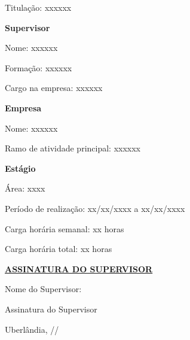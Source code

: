 \documentclass[12pt]{article}
\begin{document}
\hspace{1.1cm} Titulação: xxxxxx

\vspace{0.8cm}

\textbf{Supervisor}

\hspace{1.1cm} Nome: xxxxxx

\hspace{1.1cm} Formação: xxxxxx

\hspace{1.1cm} Cargo na empresa: xxxxxx

\vspace{0.8cm}

\textbf{Empresa}

\hspace{1.1cm} Nome: xxxxxx

\hspace{1.1cm} Ramo de atividade principal: xxxxxx

\vspace{0.8cm}

\textbf{Estágio}

\hspace{1.1cm} Área: xxxx

\hspace{1.1cm} Período de realização: xx/xx/xxxx a xx/xx/xxxx

\hspace{1.1cm} Carga horária semanal: xx horas

\hspace{1.1cm} Carga horária total: xx horas

\thispagestyle{empty}

\newpage

\begin{center}
    \small
    \underline{\textbf{ASSINATURA DO SUPERVISOR}}
\end{center}

\vspace{0.5cm}
    
\begin{center}
    Nome do Supervisor: \underline{\hspace{8.5cm}}
\end{center}

\vspace{0.5cm}

\begin{center}
    \underline{\hspace{9.5cm}}
    
    Assinatura do Supervisor
    
    Uberlândia, \underline{\hspace{1cm}}/\underline{\hspace{1cm}}/\underline{\hspace{1.1cm}}
\end{center}
\end{document}
